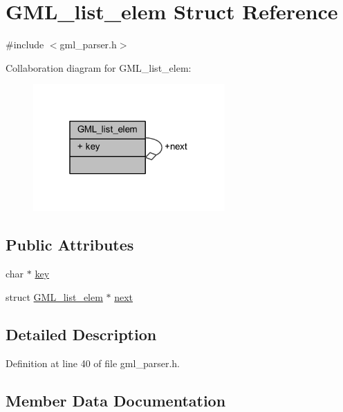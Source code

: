 \hypertarget{struct_g_m_l__list__elem}{}\section{G\+M\+L\+\_\+list\+\_\+elem Struct Reference}
\label{struct_g_m_l__list__elem}


{\ttfamily \#include $<$gml\+\_\+parser.\+h$>$}



Collaboration diagram for G\+M\+L\+\_\+list\+\_\+elem\+:\nopagebreak
\begin{figure}[H]
\begin{center}
\leavevmode
\includegraphics[width=208pt]{struct_g_m_l__list__elem__coll__graph}
\end{center}
\end{figure}
\subsection*{Public Attributes}
\begin{DoxyCompactItemize}
\item 
char $\ast$ \mbox{\hyperlink{struct_g_m_l__list__elem_af047b8e2eea4b76ca892872dee4f441c}{key}}
\item 
struct \mbox{\hyperlink{struct_g_m_l__list__elem}{G\+M\+L\+\_\+list\+\_\+elem}} $\ast$ \mbox{\hyperlink{struct_g_m_l__list__elem_a5e115c6cb92bf1b9e01e4e3500573635}{next}}
\end{DoxyCompactItemize}


\subsection{Detailed Description}


Definition at line 40 of file gml\+\_\+parser.\+h.



\subsection{Member Data Documentation}
\mbox{\label{struct_g_m_l__list__elem_af047b8e2eea4b76ca892872dee4f441c}} 

